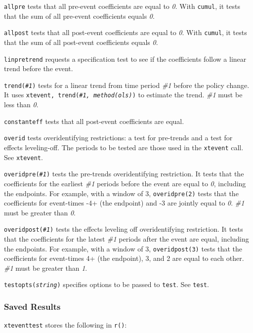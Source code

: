 \documentclass[12pt]{article}
\begin{document}
\hangpara
\texttt{allpre} tests that all pre-event coefficients are equal to {\it 0}.
With \texttt{cumul}, it tests that the sum of all pre-event coefficients equals {\it 0}.

\hangpara
\texttt{allpost} tests that all post-event coefficients are equal to {\it 0}.
With \texttt{cumul}, it tests that the sum of all post-event coefficients equals {\it 0}.

\hangpara
\texttt{linpretrend} requests a specification test to see if the coefficients follow a linear trend before the event.

\hangpara
\texttt{trend({\it \#1})} tests for a linear trend from time period {\it \#1} before the policy change. It uses \texttt{xtevent, trend({\it \#1, method(ols)})} to estimate the trend. {\it \#1} must be less than {\it 0}.

\hangpara
\texttt{constanteff} tests that all post-event coefficients are equal.

\hangpara
\texttt{overid} tests overidentifying restrictions: a test for pre-trends and a test for effects leveling-off. The periods to be tested are those used in the \texttt{xtevent} call. See {\tt xtevent}.

\hangpara
\texttt{overidpre({\it \#1})} tests the pre-trends overidentifying restriction. It tests that the coefficients for the earliest {\it \#1} periods before the event are equal to {\it 0}, including the endpoints.
For example, with a window of 3, \texttt{overidpre(2)} tests that the coefficients for event-times -4+ (the endpoint) and -3 are jointly equal to {\it 0}.
{\it \#1} must be greater than {\it 0}.

\hangpara
\texttt{overidpost({\it \#1})} tests the effects leveling off overidentifying restriction. It tests that the coefficients for the latest {\it \#1} periods after the event are equal, including the endpoints.
For example, with a window of 3, \texttt{overidpost(3)} tests that the coefficients for event-times 4+ (the endpoint), 3, and 2 are equal to each other.
{\it \#1} must be greater than {\it 1}.

\hangpara
\texttt{testopts({\it string})} specifies options to be passed to \texttt{test}. See \texttt{test}.


\subsubsection{Saved Results}
{\tt xteventtest} stores the following in {\tt r()}:
\end{document}
